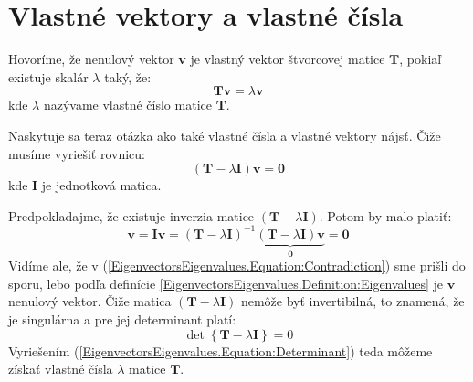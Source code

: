 \documentclass[a4paper, 10pt, ]{article}
\begin{document}
\bigskip

\normalsize
\normalfont

\section{Vlastné vektory a vlastné čísla}
\label{EigenvectorsEigenvalues}

\begin{definition}
    \label{EigenvectorsEigenvalues.Definition:Eigenvalues}
    Hovoríme, že nenulový vektor $\bm{v}$ je vlastný vektor štvorcovej matice $\bm{T}$, pokiaľ existuje skalár $\lambda$ taký, že:
    \begin{equation}
        \bm{T} \bm{v} = \lambda \bm{v}
    \end{equation}
    kde $\lambda$ nazývame vlastné číslo matice $\bm{T}$.
\end{definition}

Naskytuje sa teraz otázka ako také vlastné čísla a vlastné vektory nájsť. Čiže musíme vyriešiť rovnicu:
\begin{equation}
    \label{EigenvectorsEigenvalues.Equation:EigenvaluesEquation}
    \left( \bm{T} - \lambda \bm{I} \right) \bm{v} = \bm{0}
\end{equation}
kde $\bm{I}$ je jednotková matica.

Predpokladajme, že existuje inverzia matice $\left( \bm{T} - \lambda \bm{I} \right)$. Potom by malo platiť:
\begin{equation}
    \label{EigenvectorsEigenvalues.Equation:Contradiction}
    \bm{v} = \bm{I} \bm{v} = 
    \left( \bm{T} - \lambda \bm{I} \right)^{-1} \underbrace{\left( \bm{T} - \lambda \bm{I} \right) \bm{v}}_{\bm{0}} = \bm{0}
\end{equation}
Vidíme ale, že v (\ref{EigenvectorsEigenvalues.Equation:Contradiction}) sme prišli do sporu, lebo podľa definície \ref{EigenvectorsEigenvalues.Definition:Eigenvalues} je $\bm{v}$ nenulový vektor. Čiže matica $\left( \bm{T} - \lambda \bm{I} \right)$ nemôže byť invertibilná, to znamená, že je singulárna a pre jej determinant platí:
\begin{equation}
    \label{EigenvectorsEigenvalues.Equation:Determinant}
    \det \left\{ \bm{T} - \lambda \bm{I} \right\} = 0
\end{equation}
Vyriešením (\ref{EigenvectorsEigenvalues.Equation:Determinant}) teda môžeme získať vlastné čísla $\lambda$ matice $\bm{T}$.
\end{document}
